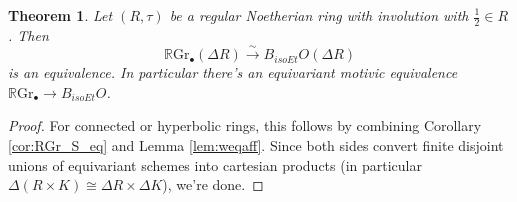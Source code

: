 \documentclass[edeposit,fullpage]{uiucthesis2009}
\newcommand{\mbb}{\mathbb}
\newcommand{\mc}{\mathcal}
\newcommand{\RGr}{\mathbb R\mathrm{Gr}}
\theoremstyle{plain}
\numberwithin{lemma}{section}
\newtheorem{theorem}[lemma]{Theorem}
\theoremstyle{definition}
\begin{document}
\begin{theorem}\label{thm:RGr_Bet}
Let $(R,\tau)$ be a regular Noetherian ring with involution with
$\frac{1}{2} \in R$. Then
\[
\RGr_\bullet(\Delta R) \xrightarrow{\sim} B_{isoEt}O(\Delta R)
\]
is an equivalence.
In particular there's an equivariant motivic equivalence $\RGr_\bullet
\rightarrow B_{isoEt}O$.
\end{theorem}

\begin{proof}
For connected or hyperbolic rings, this follows by combining Corollary
\ref{cor:RGr_S_eq} and Lemma \ref{lem:weqaff}. Since both sides
convert finite disjoint unions of equivariant schemes into cartesian
products (in particular $\Delta(R
\times K) \cong \Delta R \times \Delta K$), we're done.
\end{proof}



\end{document}
